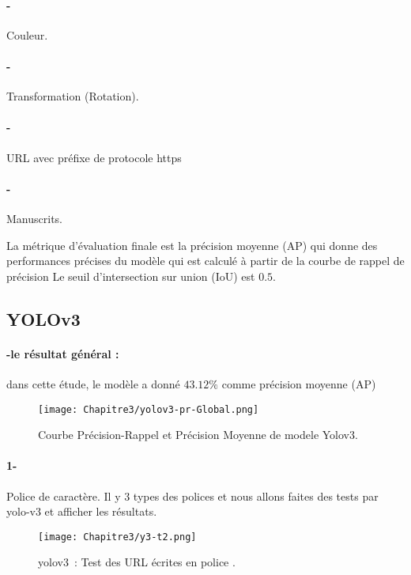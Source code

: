      \paragraph{-} Couleur.
     \paragraph{-} Transformation (Rotation).
     \paragraph{-} URL avec préfixe de protocole https
     \paragraph{-} Manuscrits.
     
     La métrique d'évaluation finale est la précision moyenne (AP) qui donne des performances précises du modèle qui est calculé à partir de la courbe de rappel de précision
     Le seuil d'intersection sur union (IoU) est $0.5$.

     \subsection{YOLOv3}
      \paragraph{-le résultat général :} 
          dans cette étude, le modèle a donné $43.12\%$ comme précision moyenne (AP) 
      \begin{figure}[H]
               \centering
                \texttt{[image: Chapitre3/yolov3-pr-Global.png]}
                \caption{Courbe Précision-Rappel et Précision Moyenne de modele Yolov3.}
                \label{y3_t0}
                \end{figure}

      \paragraph{1-} Police de caractère.
         Il y  3 types des polices  et nous allons faites des tests par yolo-v3 et afficher les résultats.
      \begin{figure}[H]
              \centering
               \texttt{[image: Chapitre3/y3-t2.png]}
               \caption{yolov3 : Test des URL écrites en police .}
               \label{y3_t1}
               \end{figure}
       
